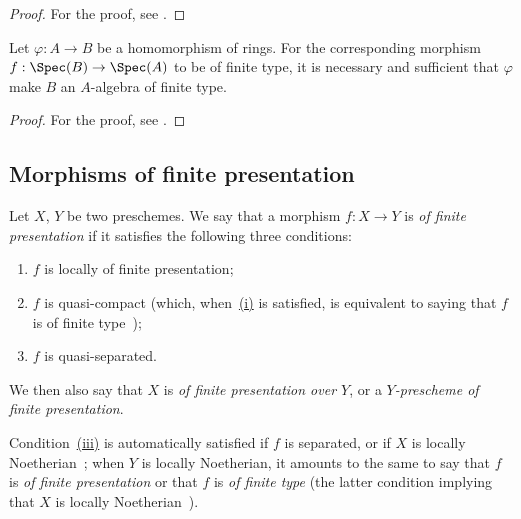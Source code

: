 \begin{proof}
For the proof, see .
\end{proof}

\begin{proposition}[1.5.7]
\label{IV.1.5.7}
Let $\varphi:A\to B$ be a homomorphism of rings.
For the corresponding morphism $f:\Spec(B)\to\Spec(A)$ to be of finite type, it is necessary and sufficient that $\varphi$ make $B$ an $A$-algebra of finite type.
\end{proposition}

\begin{proof}
For the proof, see .
\end{proof}

\subsection{Morphisms of finite presentation}
\label{subsection:IV.1.6}

\begin{definition}[1.6.1]
\label{IV.1.6.1}
Let $X$, $Y$ be two preschemes.
We say that a morphism $f:X\to Y$ is \emph{of finite presentation} if it satisfies the following three conditions:
\begin{enumerate}
  \item[\rm(i)] $f$ is locally of finite presentation;
  \item[\rm(ii)] $f$ is quasi-compact (which, when~\hyperref[IV.1.6.1]{(i)} is satisfied, is equivalent to saying that $f$ is of finite type~);
  \item[\rm(iii)] $f$ is quasi-separated.
\end{enumerate}
We then also say that $X$ is \emph{of finite presentation over $Y$}, or a \emph{$Y$-prescheme of finite presentation}.
\end{definition}

Condition~\hyperref[IV.1.6.1]{(iii)} is automatically satisfied if $f$ is separated, or if $X$ is locally Noetherian~; when $Y$ is locally Noetherian, it amounts to the same to say that $f$ is \emph{of finite presentation} or that $f$ is \emph{of finite type} (the latter condition implying that $X$ is locally Noetherian~).

